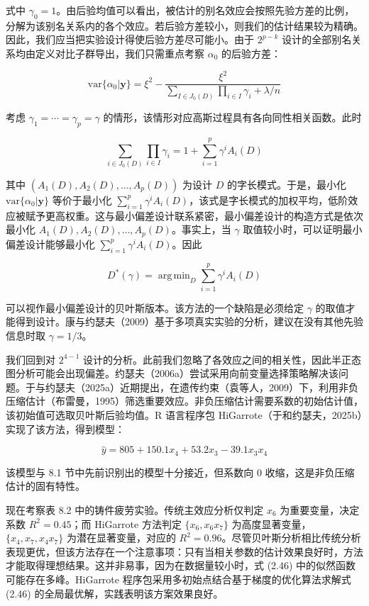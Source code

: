 \documentclass{ctexart}
\DeclareMathOperator*{\argmin}{arg\,min}
\begin{document}
式中 $\gamma_0=1$。由后验均值可以看出，被估计的别名效应会按照先验方差的比例，分解为该别名关系内的各个效应。若后验方差较小，则我们的估计结果较为精确。因此，我们应当把实验设计得使后验方差尽可能小。由于 $2^{p-k}$ 设计的全部别名关系均由定义对比子群导出，我们只需重点考察 $\alpha_0$ 的后验方差：

\begin{equation*}
\mathrm{var}\{\alpha_0|\boldsymbol{y}\}=\xi^2-\frac{\xi^2}{\sum_{I\in J_0(D)}\prod_{i\in I}\gamma_i+\lambda/n}
\end{equation*}

考虑 $\gamma_1=\cdots=\gamma_p=\gamma$ 的情形，该情形对应高斯过程具有各向同性相关函数。此时

\begin{equation*}
\sum_{i\in J_0(D)}\prod_{i\in I}\gamma_i=1+\sum_{i=1}^{p}\gamma^i A_i(D)
\end{equation*}

其中 $(A_1(D),A_2(D),\dots,A_p(D))$ 为设计 $D$ 的字长模式。于是，最小化 $\mathrm{var}\{\alpha_0|\boldsymbol{y}\}$ 等价于最小化 $\sum_{i=1}^{p}\gamma^i A_i(D)$，该式是字长模式的加权平均，低阶效应被赋予更高权重。这与最小偏差设计联系紧密，最小偏差设计的构造方式是依次最小化 $A_1(D),A_2(D),\dots,A_p(D)$。事实上，当 $\gamma$ 取值较小时，可以证明最小偏差设计能够最小化 $\sum_{i=1}^{p}\gamma^i A_i(D)$。因此

\begin{equation*}
D^*(\gamma)=\argmin_{D}\sum_{i=1}^{p}\gamma^i A_i(D)
\end{equation*}

可以视作最小偏差设计的贝叶斯版本。该方法的一个缺陷是必须给定 $\gamma$ 的取值才能得到设计。康与约瑟夫（2009）基于多项真实实验的分析，建议在没有其他先验信息时取 $\gamma=1/3$。

我们回到对 $2^{4-1}$ 设计的分析。此前我们忽略了各效应之间的相关性，因此半正态图分析可能会出现偏差。约瑟夫（2006a）尝试采用向前变量选择策略解决该问题。于与约瑟夫（2025a）近期提出，在遗传约束（袁等人，2009）下，利用非负压缩估计（布雷曼，1995）筛选重要效应。非负压缩估计需要系数的初始估计值，该初始值可选取贝叶斯后验均值。R 语言程序包 HiGarrote（于和约瑟夫，2025b）实现了该方法，得到模型：

\begin{equation*}
\widehat{y}=805+150.1x_4+53.2x_3-39.1x_3x_4
\end{equation*}

该模型与 8.1 节中先前识别出的模型十分接近，但系数向 0 收缩，这是非负压缩估计的固有特性。

现在考察表 8.2 中的铸件疲劳实验。传统主效应分析仅判定 $x_6$ 为重要变量，决定系数 $R^2=0.45$；而 HiGarrote 方法判定 $\{x_6,x_6x_7\}$ 为高度显著变量，$\{x_4,x_7,x_4x_7\}$ 为潜在显著变量，对应的 $R^2=0.96$。尽管贝叶斯分析相比传统分析表现更优，但该方法存在一个注意事项：只有当相关参数的估计效果良好时，方法才能取得理想结果。这并非易事，因为在数据量较小时，式 (2.46) 中的似然函数可能存在多峰。HiGarrote 程序包采用多初始点结合基于梯度的优化算法求解式 (2.46) 的全局最优解，实践表明该方案效果良好。
\end{document}
